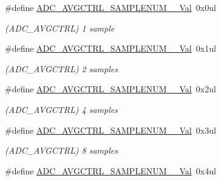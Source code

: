 \begin{DoxyCompactItemize}
\item 
\hypertarget{group___s_a_m_l21___a_d_c_ga9e70c7b0cd6dbf66fd9a26c9f664c094}{}\#define \hyperlink{group___s_a_m_l21___a_d_c_ga9e70c7b0cd6dbf66fd9a26c9f664c094}{A\+D\+C\+\_\+\+A\+V\+G\+C\+T\+R\+L\+\_\+\+S\+A\+M\+P\+L\+E\+N\+U\+M\+\_\+\_\+\+Val}~0x0ul\label{group___s_a_m_l21___a_d_c_ga9e70c7b0cd6dbf66fd9a26c9f664c094}

\begin{DoxyCompactList}\small\item\em (A\+D\+C\+\_\+\+A\+V\+G\+C\+T\+R\+L) 1 sample \end{DoxyCompactList}\item 
\hypertarget{group___s_a_m_l21___a_d_c_ga02a97329331932ee77e50645ba2af513}{}\#define \hyperlink{group___s_a_m_l21___a_d_c_ga02a97329331932ee77e50645ba2af513}{A\+D\+C\+\_\+\+A\+V\+G\+C\+T\+R\+L\+\_\+\+S\+A\+M\+P\+L\+E\+N\+U\+M\+\_\+\_\+\+Val}~0x1ul\label{group___s_a_m_l21___a_d_c_ga02a97329331932ee77e50645ba2af513}

\begin{DoxyCompactList}\small\item\em (A\+D\+C\+\_\+\+A\+V\+G\+C\+T\+R\+L) 2 samples \end{DoxyCompactList}\item 
\hypertarget{group___s_a_m_l21___a_d_c_ga2a0b01d83c38d590419a36959b3bb785}{}\#define \hyperlink{group___s_a_m_l21___a_d_c_ga2a0b01d83c38d590419a36959b3bb785}{A\+D\+C\+\_\+\+A\+V\+G\+C\+T\+R\+L\+\_\+\+S\+A\+M\+P\+L\+E\+N\+U\+M\+\_\+\_\+\+Val}~0x2ul\label{group___s_a_m_l21___a_d_c_ga2a0b01d83c38d590419a36959b3bb785}

\begin{DoxyCompactList}\small\item\em (A\+D\+C\+\_\+\+A\+V\+G\+C\+T\+R\+L) 4 samples \end{DoxyCompactList}\item 
\hypertarget{group___s_a_m_l21___a_d_c_gaccc8c475aeda72ace654784ec4586bf3}{}\#define \hyperlink{group___s_a_m_l21___a_d_c_gaccc8c475aeda72ace654784ec4586bf3}{A\+D\+C\+\_\+\+A\+V\+G\+C\+T\+R\+L\+\_\+\+S\+A\+M\+P\+L\+E\+N\+U\+M\+\_\+\_\+\+Val}~0x3ul\label{group___s_a_m_l21___a_d_c_gaccc8c475aeda72ace654784ec4586bf3}

\begin{DoxyCompactList}\small\item\em (A\+D\+C\+\_\+\+A\+V\+G\+C\+T\+R\+L) 8 samples \end{DoxyCompactList}\item 
\hypertarget{group___s_a_m_l21___a_d_c_ga5edfb4fb05fa1c6854f3bf7e1be6f325}{}\#define \hyperlink{group___s_a_m_l21___a_d_c_ga5edfb4fb05fa1c6854f3bf7e1be6f325}{A\+D\+C\+\_\+\+A\+V\+G\+C\+T\+R\+L\+\_\+\+S\+A\+M\+P\+L\+E\+N\+U\+M\+\_\+\_\+\+Val}~0x4ul\label{group___s_a_m_l21___a_d_c_ga5edfb4fb05fa1c6854f3bf7e1be6f325}


\end{DoxyCompactItemize}
